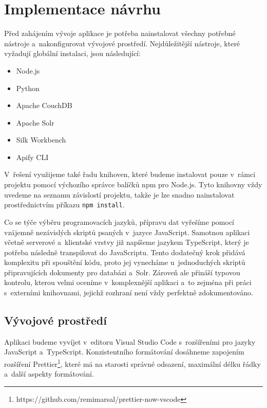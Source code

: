 
\chapter{Implementace návrhu}

Před zahájením vývoje aplikace je potřeba nainstalovat všechny potřebné nástroje a~nakonfigurovat vývojové prostředí. Nejdůležitější nástroje, které vyžadují globální instalaci, jsou následující:

\begin{itemize}
    \item Node.js
    \item Python
    \item Apache CouchDB
    \item Apache Solr
    \item Silk Workbench
    \item Apify CLI
\end{itemize}

V~řešení využijeme také řadu knihoven, které budeme instalovat pouze v~rámci projektu pomocí výchozího správce balíčků npm pro Node.js. Tyto knihovny vždy uvedeme na seznamu závislostí projektu, takže je lze snadno nainstalovat prostřednictvím příkazu \texttt{npm install}.

Co se týče výběru programovacích jazyků, přípravu dat vyřešíme pomocí vzájemně nezávislých skriptů psaných v~jazyce JavaScript. Samotnou aplikaci včetně serverové a~klientské vrstvy již napíšeme jazykem TypeScript, který je potřeba následně transpilovat do JavaScriptu. Tento dodatečný krok přidává komplexitu při spouštění kódu, proto jej vynecháme u~jednoduchých skriptů připravujících dokumenty pro databázi a~Solr. Zároveň ale přináší typovou kontrolu, kterou velmi oceníme v~komplexnější aplikaci a~to zejména při práci s~externími knihovnami, jejichž rozhraní není vždy perfektně zdokumentováno.

\section{Vývojové prostředí}

Aplikaci budeme vyvíjet v~editoru Visual Studio Code s~rozšířeními pro jazyky JavaScript a~TypeScript. Konzistentního formátování dosáhneme zapojením rozšíření Prettier\footnote{https://github.com/remimarsal/prettier-now-vscode}, které má na starosti správné odsazení, maximální délku řádky a~další aspekty formátování.

